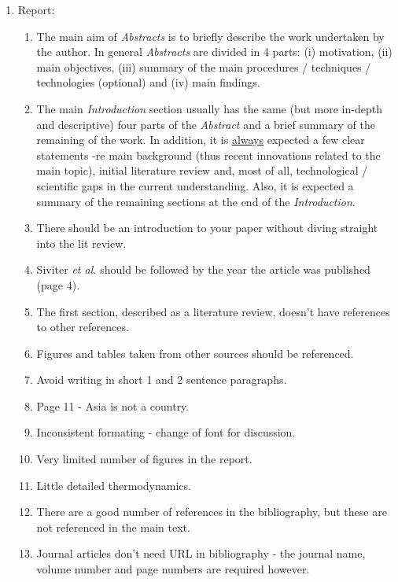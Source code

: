 \documentclass[14pt,twoside]{report}
\begin{document}
\begin{enumerate}

\item Report:
\begin{enumerate}
%
\item The main aim of {\it Abstracts} is to briefly describe the work undertaken by the author. In general {\it Abstracts} are divided in 4 parts: (i) motivation, (ii) main objectives, (iii) summary of the main procedures / techniques / technologies (optional) and (iv) main findings. 
%
\item The main {\it Introduction} section usually has the same (but more in-depth and descriptive) four parts of the {\it Abstract} and a brief summary of the remaining of the work. In addition, it is \underline{always} expected a few clear statements -re main background (thus recent innovations related to the main topic), initial literature review and, most of all, technological / scientific gaps in the current understanding. Also, it is expected a summary of the remaining sections at the end of the {\it Introduction}.
%
\item There should be an introduction to your paper without diving straight into the lit review.
%
\item Siviter {\it et al.} should be followed by the year the article was published (page 4).
%
\item The first section, described as a literature review, doesn't have references to other references.
%
\item Figures and tables taken from other sources should be referenced.
%
\item Avoid writing in short 1 and 2 sentence paragraphs.
%
\item Page 11 - Asia is not a country.
%
\item Inconsistent formating - change of font for discussion.
%
\item Very limited number of figures in the report.
%
\item Little detailed thermodynamics.
%
\item There are a good number of references in the bibliography, but these are not referenced in the main text.
%
\item Journal articles don't need URL in bibliography - the journal name, volume number and page numbers are required however.


\end{enumerate}
\end{enumerate}
\end{document}
